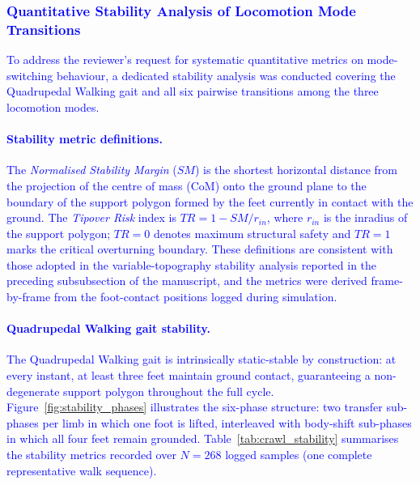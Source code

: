\documentclass[preprint,12pt]{elsarticle}
\newcommand{\revblue}[1]{\textcolor{blue}{#1}}
\begin{document}
\subsubsection{\revblue{Quantitative Stability Analysis of Locomotion Mode Transitions}}
\label{sssec:transition_stability}

\revblue{%
To address the reviewer's request for systematic quantitative metrics
on mode-switching behaviour, a dedicated stability analysis was
conducted covering the Quadrupedal Walking gait and all six pairwise transitions
among the three locomotion modes.
}

\paragraph{\revblue{Stability metric definitions.}}

\revblue{%
The \emph{Normalised Stability Margin} ($SM$) is the shortest
horizontal distance from the projection of the centre of mass (CoM)
onto the ground plane to the boundary of the support polygon formed
by the feet currently in contact with the ground.
The \emph{Tipover Risk} index is $TR = 1 - SM / r_{in}$, where
$r_{in}$ is the inradius of the support polygon;
$TR = 0$ denotes maximum structural safety and $TR = 1$ marks the
critical overturning boundary.
These definitions are consistent with those adopted in the
variable-topography stability analysis reported in the preceding
subsubsection of the manuscript, and the metrics were derived
frame-by-frame from the foot-contact positions logged during
simulation.
}

\paragraph{\revblue{Quadrupedal Walking gait stability.}}

\revblue{%
The Quadrupedal Walking gait is intrinsically
static-stable by construction: at every instant, at least three feet
maintain ground contact, guaranteeing a non-degenerate
support polygon throughout the full cycle.
Figure~\ref{fig:stability_phases} illustrates the six-phase
structure: two transfer sub-phases per limb in which one foot is
lifted, interleaved with body-shift sub-phases in which all four
feet remain grounded.
Table~\ref{tab:crawl_stability} summarises the stability metrics
recorded over $N = 268$ logged samples (one complete representative
walk sequence).
}
\end{document}
